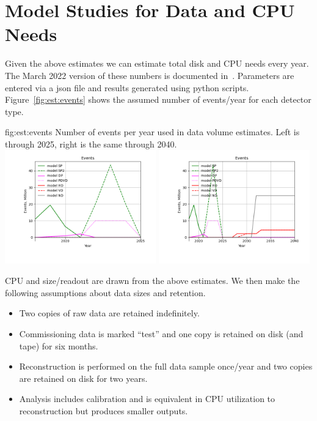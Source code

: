 \documentclass[../main-v1.tex]{subfiles}
\begin{document}
\section{Model Studies for Data and CPU Needs }
\label{sec:est:volumes}

Given the above estimates we can  estimate total disk and CPU needs every year.  The March 2022 version of these numbers is documented in~\cite{bib:docdb24732}.  Parameters are entered via a json file and results generated using python scripts. Figure~\ref{fig:est:events} shows the assumed number of events/year for each detector type.  

\begin{dunefigure}
{fig:est:events}
{Number of events per year used in data volume estimates. Left is through 2025, right is the same through 2040.  }
\includegraphics[width=0.49\textwidth]{graphics/IntroFigures/2025/Parameters_2022-03-04-2025-Events.png}
\includegraphics[width=0.49\textwidth]{graphics/IntroFigures/2040/Parameters_2022-03-04-2040-Events.png}
\end{dunefigure}

CPU and size/readout are drawn from the above estimates. We then make the following assumptions about data sizes and retention.  

\begin{itemize}
\item Two copies of raw data are retained indefinitely.
\item Commissioning data is marked ``test'' and one copy is retained on disk (and tape) for six months. 
\item Reconstruction is performed on the full data sample once/year and two copies are retained on disk for two years.  
\item Analysis includes calibration and is  equivalent in CPU utilization to reconstruction but produces smaller outputs. 
\end{itemize}
\end{document}
